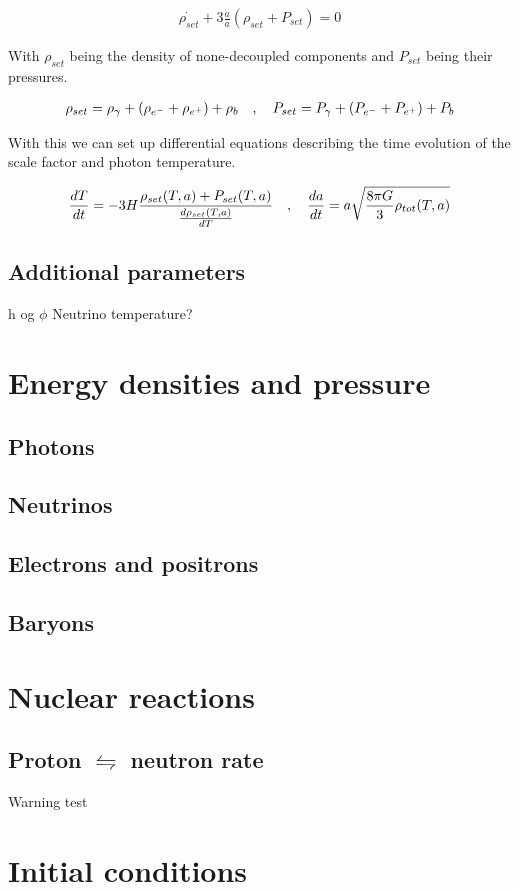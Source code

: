 \begin{align}
    \dot{\rho_{set}}+3\frac{\dot{a}}{a}(\rho_{set} + P_{set})=0
\end{align}

With $\rho_{set}$ being the density of none-decoupled components and $P_{set}$ being their pressures.


\begin{align}
    \rho_{set}=\rho_{\gamma}+(\rho_{e^-}+\rho_{e^+})+\rho_{b}
    \quad , \quad P_{set}=P_{\gamma}+(P_{e^-}+P_{e^+})+P_{b}
\end{align}

With this we can set up differential equations describing the time evolution of the scale factor and photon temperature. 


\begin{align}
    \frac{dT}{dt}=-3H\frac{\rho_{set}(T,a) + P_{set}(T,a)}{\frac{d\rho_{set}(T,a)}{dT}} \quad , \quad \frac{da}{dt}=a\sqrt{\frac{8\pi G}{3}\rho_{tot}(T,a)}
\end{align}

\subsection{Additional parameters}

h og $\phi$
Neutrino temperature?


\section{Energy densities and pressure}

\subsection{Photons}

\subsection{Neutrinos}

\subsection{Electrons and positrons}

\subsection{Baryons}

\lipsum




\section{Nuclear reactions}
\label{sec:nucleartheory}

\subsection{Proton $\leftrightharpoons$ neutron rate}




Warning test

\lipsum

\section{Initial conditions}